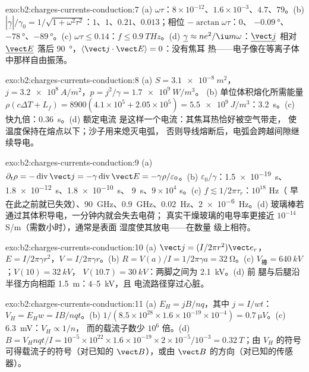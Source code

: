 \begin{solution}{exo:b2:charges-currents-conduction:7}
(a) $\omega\tau$：$8 \times 10^{-12}$、$1.6 \times 10^{-3}$、$4.7$、$79$。(b) $|\underline\gamma|/\gamma_0 =
1/\sqrt{1 + \omega^2\tau^2}$：$1$、$1$、$0.21$、$0.013$；相位 $-\arctan\omega\tau$：$0$、
$-\qty{0.09}{\degree}$、$-\qty{78}{\degree}$、$-\qty{89}{\degree}$。(c) $\omega\tau \le 0.14$：$f \le
\qty{0.9}{THz}$。(d) $\underline\gamma \approx ne^2/\iu m\omega$：$\underline{\vect j}$ 相对
$\underline{\vect E}$ 落后 \qty{90}{\degree}，$\langle\vect j\cdot\vect E\rangle = 0$：没有焦耳
热——电子像在等离子体中那样自由振荡。
\end{solution}

\begin{solution}{exo:b2:charges-currents-conduction:8}
(a) $S = \qty{3.1e-8}{m^2}$，$j = \qty{3.2e8}{A/m^2}$，$p = j^2/\gamma = \qty{1.7e9}{W/m^3}$。
(b) 单位体积熔化所需能量 $\rho(c\Delta T + L_f) = 8900(4.1 \times 10^5 + 2.05 \times
10^5) = \qty{5.5e9}{J/m^3}$：\qty{3.2}{s}。(c) 快九倍：\qty{0.36}{s}。(d) 额定电流
是这样一个电流：其焦耳热恰好被空气带走，
使温度保持在熔点以下；沙子用来熄灭电弧，
否则导线熔断后，电弧会跨越间隙继续导电。
\end{solution}

\begin{solution}{exo:b2:charges-currents-conduction:9}
(a) $\partial_t\rho = -\operatorname{div}\vect j = -\gamma\operatorname{div}\vect E = -\gamma\rho/
\varepsilon_0$。(b) $\varepsilon_0/\gamma$：\qty{1.5e-19}{s}、\qty{1.8e-12}{s}、\qty{1.8e-10}{s}、
\qty{9}{s}、$9 \times 10^4$ s。(c) $f \lesssim 1/2\pi\tau_r$：$10^{18}$ Hz（
早在此之前就已失效）、\qty{90}{GHz}、\qty{0.9}{GHz}、\qty{0.02}{Hz}、\qty{2e-6}{Hz}。(d)
玻璃棒若通过其体积导电，一分钟内就会失去电荷；
真实干燥玻璃的电导率更接近 $10^{-14}$ S/m（需数小时），通常是表面
湿度使其放电——在数量
级上相符。
\end{solution}

\begin{solution}{exo:b2:charges-currents-conduction:10}
(a) $\vect j = (I/2\pi r^2)\vect e_r$，$E = I/2\pi\gamma r^2$，$V = I/2\pi\gamma r$。(b) $R = V(a)
/I = 1/2\pi\gamma a = \qty{32}{\ohm}$。(c) $V_{\text{棒}} = \qty{640}{kV}$；$V(10) = \qty{32}{kV}$，
$V(10.7) = \qty{30}{kV}$：两脚之间为 \qty{2.1}{kV}。(d) 前
腿与后腿沿半径方向相距 \qty{1.5}{m}：$4$--\qty{5}{kV}，且
电流路径穿过心脏。
\end{solution}

\begin{solution}{exo:b2:charges-currents-conduction:11}
(a) $E_H = jB/nq$，其中 $j = I/wt$：$V_H = E_Hw = IB/nqt$。(b) $1/(8.5 \times 10^{28}
\times 1.6 \times 10^{-19} \times 10^{-4}) = \qty{0.7}{\micro V}$。(c) \qty{6.3}{mV}：$V_H \propto 1/n$，
而的载流子数少 $10^6$ 倍。(d) $B = V_Hnqt/I =
10^{-5} \times 10^{22} \times 1.6 \times 10^{-19} \times 2 \times 10^{-5}/10^{-3} = \qty{0.32}{T}$；由
$V_H$ 的符号可得载流子的符号（对已知的 $\vect B$），或由
$\vect B$ 的方向（对已知的传感器）。
\end{solution}

